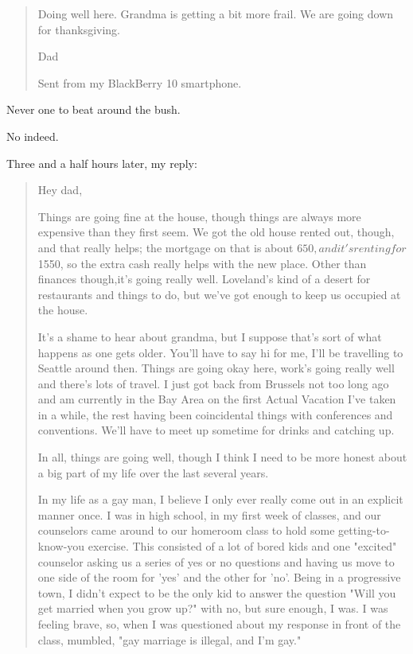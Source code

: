 \begin{paracol}{2}
\begin{leftcolumn}
\begin{quotation}
Doing well here. Grandma is getting a bit more frail. We are going down for thanksgiving.

Dad

Sent from my BlackBerry 10 smartphone.
\end{quotation}

\begin{ally}
Never one to beat around the bush.
\end{ally}
No indeed.

Three and a half hours later, my reply:

\begin{quotation}
Hey dad,

Things are going fine at the house, though things are always more expensive than they first seem.  We got the old house rented out, though, and that really helps; the mortgage on that is about $650, and it's renting for $1550, so the extra cash really helps with the new place.  Other than finances though,it's going really well.  Loveland's kind of a desert for restaurants and things to do, but we've got enough to keep us occupied at the house.

It's a shame to hear about grandma, but I suppose that's sort of what happens as one gets older.  You'll have to say hi for me, I'll be travelling to Seattle around then.  Things are going okay here, work's going really well and there's lots of travel.  I just got back from Brussels not too long ago and am currently in the Bay Area on the first Actual Vacation I've taken in a while, the rest having been coincidental things with conferences and conventions.  We'll have to meet up sometime for drinks and catching up.

In all, things are going well, though I think I need to be more honest about a big part of my life over the last several years.

In my life as a gay man, I believe I only ever really come out in an explicit manner once.  I was in high school, in my first week of classes, and our counselors came around to our homeroom class to hold some getting-to-know-you exercise.  This consisted of a lot of bored kids and one "excited" counselor asking us a series of yes or no questions and having us move to one side of the room for 'yes' and the other for 'no'.  Being in a progressive town, I didn't expect to be the only kid to answer the question "Will you get married when you grow up?" with no, but sure enough, I was.  I was feeling brave, so, when I was questioned about my response in front of the class, mumbled, "gay marriage is illegal, and I'm gay."


\end{quotation}
\end{leftcolumn}
\end{paracol}
